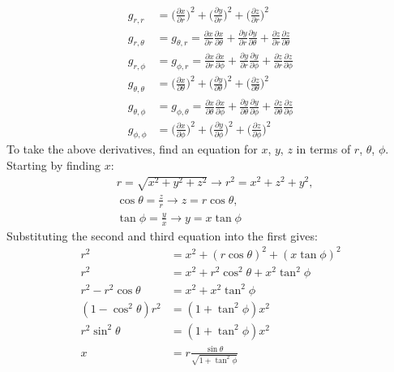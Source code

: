 \documentclass[9pt]{report}
\begin{document}
\begin{enumerate}
\begin{enumerate}
\[\begin{align*}
    g_{r,r} &=
    \Bigg( \frac{\partial x}{\partial r}\Bigg)^2+
    \Bigg(\frac{\partial y}{\partial r}\Bigg)^2+
    \Bigg(\frac{\partial z}{\partial r}\Bigg)^2\\
    g_{r,\theta} &= g_{\theta,r} = \frac{\partial x}{\partial r} \frac{\partial x}{\partial \theta}
    +\frac{\partial y}{\partial r} \frac{\partial y}{\partial \theta}
    +\frac{\partial z}{\partial r} \frac{\partial z}{\partial \theta}\\
    g_{r,\phi} &= g_{\phi,r} = \frac{\partial x}{\partial r} \frac{\partial x}{\partial \phi}
    + \frac{\partial y}{\partial r} \frac{\partial y}{\partial \phi}
    + \frac{\partial z}{\partial r} \frac{\partial z}{\partial \phi}\\
    g_{\theta,\theta} &=
    \Bigg( \frac{\partial x}{\partial \theta}\Bigg)^2+
    \Bigg(\frac{\partial y}{\partial \theta}\Bigg)^2+
    \Bigg(\frac{\partial z}{\partial \theta}\Bigg)^2\\
    g_{\theta,\phi} &= g_{\phi,\theta} = \frac{\partial x}{\partial \theta} \frac{\partial x}{\partial \phi}
    +\frac{\partial y}{\partial \theta} \frac{\partial y}{\partial \phi}
    +\frac{\partial z}{\partial \theta} \frac{\partial z}{\partial \phi} \\
    g_{\phi,\phi} &=
    \Bigg( \frac{\partial x}{\partial \phi}\Bigg)^2+
    \Bigg(\frac{\partial y}{\partial \phi}\Bigg)^2+
    \Bigg(\frac{\partial z}{\partial \phi}\Bigg)^2
    \end{align*}
  \]
  To take the above derivatives, find an equation for $x$, $y$, $z$ in terms of $r$, $\theta$, $\phi$.
  Starting by finding $x$:
  \[
    \begin{align*}
      &r = \sqrt{x^2 + y^2 + z^2} \to r^2= x^2+z^2+y^2,\\
      &\cos\theta = \frac{z}{r} \to z = r\cos\theta, \\
      &\tan\phi = \frac{y}{x} \to y = x\tan\phi
    \end{align*}
  \]
  Substituting the second and third equation into the first gives:
  \[
    \begin{align*}
      r^2&=x^2+(r\cos\theta)^2+(x\tan\phi)^2\\
      r^2&=x^2+r^2\cos^2\theta+x^2\tan^2\phi\\
      r^2-r^2\cos\theta&=x^2+x^2\tan^2\phi\\
      (1-\cos^2\theta)r^2&=(1+\tan^2\phi)x^2\\
      r^2\sin^2\theta &=(1+\tan^2\phi)x^2\\
      x&=r\frac{\sin\theta}{\sqrt{1+\tan^2\phi}}\\

\end{align*}\]
\end{enumerate}
\end{enumerate}
\end{document}
